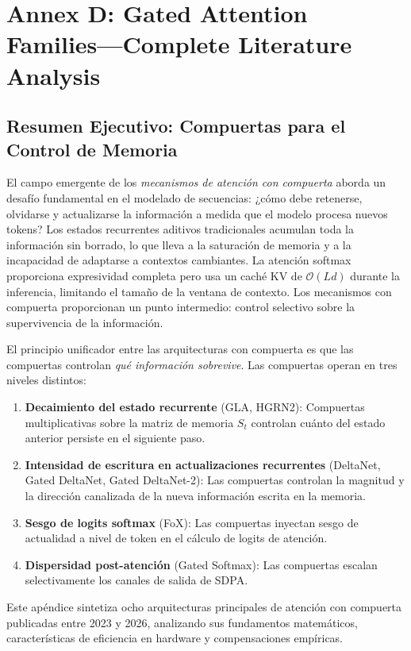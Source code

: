 \section{Annex D: Gated Attention Families---Complete Literature Analysis}
\label{sec:annex-gated}

\subsection{Resumen Ejecutivo: Compuertas para el Control de Memoria}

El campo emergente de los \emph{mecanismos de atención con compuerta} aborda un desafío fundamental en el modelado de secuencias: ¿cómo debe retenerse, olvidarse y actualizarse la información a medida que el modelo procesa nuevos tokens? Los estados recurrentes aditivos tradicionales acumulan toda la información sin borrado, lo que lleva a la saturación de memoria y a la incapacidad de adaptarse a contextos cambiantes. La atención softmax proporciona expresividad completa pero usa un caché KV de $\mathcal{O}(Ld)$ durante la inferencia, limitando el tamaño de la ventana de contexto. Los mecanismos con compuerta proporcionan un punto intermedio: control selectivo sobre la supervivencia de la información.

El principio unificador entre las arquitecturas con compuerta es que las compuertas controlan \textit{qué información sobrevive}. Las compuertas operan en tres niveles distintos:
\begin{enumerate}[leftmargin=*]
    \item \textbf{Decaimiento del estado recurrente} (GLA, HGRN2): Compuertas multiplicativas sobre la matriz de memoria $S_t$ controlan cuánto del estado anterior persiste en el siguiente paso.
    \item \textbf{Intensidad de escritura en actualizaciones recurrentes} (DeltaNet, Gated DeltaNet, Gated DeltaNet-2): Las compuertas controlan la magnitud y la dirección canalizada de la nueva información escrita en la memoria.
    \item \textbf{Sesgo de logits softmax} (FoX): Las compuertas inyectan sesgo de actualidad a nivel de token en el cálculo de logits de atención.
    \item \textbf{Dispersidad post-atención} (Gated Softmax): Las compuertas escalan selectivamente los canales de salida de SDPA.
\end{enumerate}

Este apéndice sintetiza ocho arquitecturas principales de atención con compuerta publicadas entre 2023 y 2026, analizando sus fundamentos matemáticos, características de eficiencia en hardware y compensaciones empíricas.

